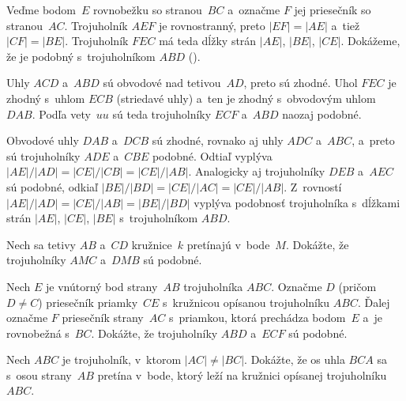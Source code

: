 {%
Veďme bodom~$E$ rovnobežku so stranou~$BC$ a~označme $F$ jej priesečník so stranou~$AC$. Trojuholník $AEF$ je rovnostranný, preto $|EF|=|AE|$ a~tiež $|CF|=|BE|$. Trojuholník $FEC$ má teda dĺžky strán $|AE|$, $|BE|$, $|CE|$. Dokážeme, že je podobný s~trojuholníkom $ABD$ (\obr).
%

Uhly $ACD$ a~$ABD$ sú obvodové nad tetivou~$AD$, preto sú zhodné. Uhol $FEC$ je zhodný s~uhlom $ECB$ (striedavé uhly) a~ten je zhodný s~obvodovým uhlom $DAB$. Podľa vety~$uu$ sú teda trojuholníky $ECF$ a~$ABD$ naozaj podobné.

\ineriesenie
Obvodové uhly $DAB$ a~$DCB$ sú zhodné, rovnako aj uhly $ADC$ a~$ABC$, a~preto sú trojuholníky
$ADE$ a~$CBE$ podobné. Odtiaľ vyplýva $|AE|/|AD|=|CE|/|CB|=|CE|/|AB|$. Analogicky aj trojuholníky $DEB$ a~$AEC$ sú podobné, odkiaľ $|BE|/|BD|=|CE|/|AC|=|CE|/|AB|$. Z~rovností
$|AE|/|AD|=|CE|/|AB|=|BE|/|BD|$ vyplýva podobnosť trojuholníka s~dĺžkami strán $|AE|$, $|CE|$, $|BE|$ s~trojuholníkom $ABD$.

Nech sa tetivy $AB$ a~$CD$ kružnice~$k$ pretínajú v~bode~$M$. Dokážte, že trojuholníky $AMC$ a~$DMB$ sú podobné.

Nech $E$ je vnútorný bod strany~$AB$ trojuholníka $ABC$. Označme $D$ (pričom $D\ne C$) priesečník priamky~$CE$ s~kružnicou opísanou trojuholníku $ABC$. Ďalej označme $F$ priesečník strany~$AC$ s~priamkou, ktorá prechádza bodom~$E$ a~je rovnobežná s~$BC$. Dokážte, že trojuholníky $ABD$ a~$ECF$ sú podobné.

\D
Nech $ABC$ je trojuholník, v~ktorom $|AC|\ne|BC|$. Dokážte, že os uhla $BCA$ sa s~osou strany~$AB$ pretína
v~bode, ktorý leží na kružnici opísanej trojuholníku $ABC$.
}

